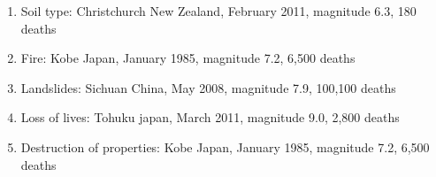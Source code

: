 \documentclass[oneside]{book}
\begin{document}
\begin{minipage}{0.5\textwidth}
\begin{enumerate}
    \item Soil type: Christchurch New Zealand, February 2011, magnitude 6.3, 180 deaths
    
    \item Fire: Kobe Japan, January 1985, magnitude 7.2, 6,500 deaths

    \item Landslides: Sichuan China, May 2008, magnitude 7.9, 100,100 deaths
    
    \item Loss of lives: Tohuku japan, March 2011, magnitude 9.0, 2,800 deaths
    
    \item Destruction of properties: Kobe Japan, January 1985, magnitude 7.2, 6,500 deaths
  \end{enumerate}  
\end{minipage}
\end{document}
